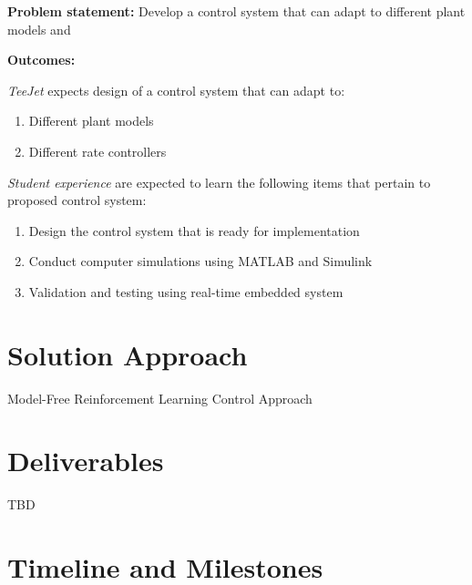 {\bf Problem statement:} Develop a control system that can adapt to different plant models and 

{\bf Outcomes:}

\textit{TeeJet} expects design of a  control system that can adapt to: %
\begin{enumerate}
\item Different plant models
  
\item Different rate controllers 
\end{enumerate}

\textit{Student experience}  are expected to learn the following items that pertain to proposed control system:
\begin{enumerate}
\item Design the control system that is ready for implementation
  
\item Conduct computer simulations using MATLAB and Simulink
  
\item Validation and testing using real-time embedded system 
  

\end{enumerate}


\section{Solution Approach}
\label{sec:solutionApproach}

Model-Free Reinforcement Learning Control Approach


\section{Deliverables}
\label{sec:deliverables}

TBD

\section{Timeline and Milestones}
\label{sec:timeline}



